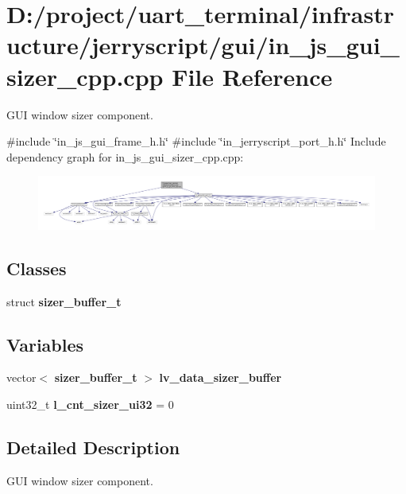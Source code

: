 \section{D\+:/project/uart\+\_\+terminal/infrastructure/jerryscript/gui/in\+\_\+js\+\_\+gui\+\_\+sizer\+\_\+cpp.cpp File Reference}
\label{in__js__gui__sizer__cpp_8cpp}


G\+UI window sizer component.  


{\ttfamily \#include \char`\"{}in\+\_\+js\+\_\+gui\+\_\+frame\+\_\+h.\+h\char`\"{}}\newline
{\ttfamily \#include \char`\"{}in\+\_\+jerryscript\+\_\+port\+\_\+h.\+h\char`\"{}}\newline
Include dependency graph for in\+\_\+js\+\_\+gui\+\_\+sizer\+\_\+cpp.\+cpp\+:
\nopagebreak
\begin{figure}[H]
\begin{center}
\leavevmode
\includegraphics[width=350pt]{in__js__gui__sizer__cpp_8cpp__incl}
\end{center}
\end{figure}
\subsection*{Classes}
\begin{DoxyCompactItemize}
\item 
struct \textbf{ sizer\+\_\+buffer\+\_\+t}
\end{DoxyCompactItemize}
\subsection*{Variables}
\begin{DoxyCompactItemize}
\item 
vector$<$ \textbf{ sizer\+\_\+buffer\+\_\+t} $>$ \textbf{ lv\+\_\+data\+\_\+sizer\+\_\+buffer}
\item 
uint32\+\_\+t {\bfseries l\+\_\+cnt\+\_\+sizer\+\_\+ui32} = 0
\end{DoxyCompactItemize}


\subsection{Detailed Description}
G\+UI window sizer component. 


